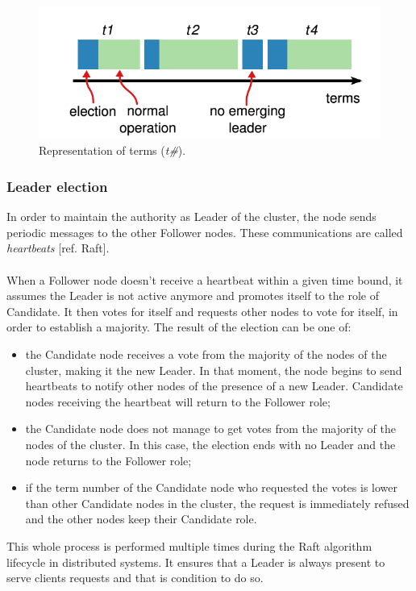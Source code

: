 \begin{figure}[h]
	\centering
	\includegraphics[width=0.7\linewidth]{"immagini/Technologies/image2.png"}
	\caption{Representation of terms (\textit{t\#}).}
	\label{fig:terms}
\end{figure}
\subsubsection{Leader election}
In order to maintain the authority as Leader of the cluster, the node sends periodic messages to the other Follower nodes. These communications are called \textit{heartbeats} [ref. Raft]. \\ \\
When a Follower node doesn't receive a heartbeat within a given time bound, it assumes the Leader is not active anymore and promotes itself to the role of Candidate. It then votes for itself and requests other nodes to vote for itself, in order to establish a majority. The result of the election can be one of:
\begin{itemize}
	\item the Candidate node receives a vote from the majority of the nodes of the cluster, making it the new Leader. In that moment, the node begins to send heartbeats to notify other nodes of the presence of a new Leader. Candidate nodes receiving the heartbeat will return to the Follower role;
	\item the Candidate node does not manage to get votes from the majority of the nodes of the cluster. In this case, the election ends with no Leader and the node returns to the Follower role;
	\item if the term number of the Candidate node who requested the votes is lower than other Candidate nodes in the cluster, the request is immediately refused and the other nodes keep their Candidate role.
\end{itemize}
This whole process is performed multiple times during the Raft algorithm lifecycle in distributed systems. It ensures that a Leader is always present to serve clients requests and that is condition to do so.
